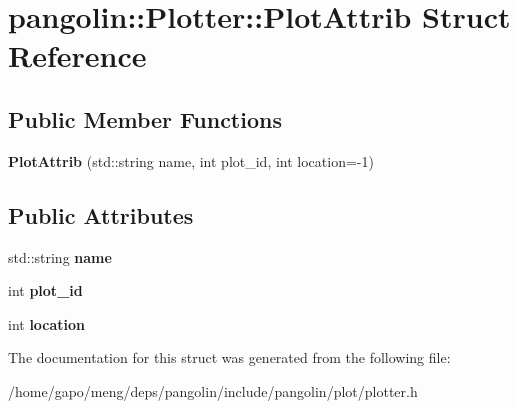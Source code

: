 \hypertarget{structpangolin_1_1_plotter_1_1_plot_attrib}{}\section{pangolin\+:\+:Plotter\+:\+:Plot\+Attrib Struct Reference}
\label{structpangolin_1_1_plotter_1_1_plot_attrib}
\subsection*{Public Member Functions}
\begin{DoxyCompactItemize}
\item 
{\bfseries Plot\+Attrib} (std\+::string name, int plot\+\_\+id, int location=-\/1)\hypertarget{structpangolin_1_1_plotter_1_1_plot_attrib_ae0a3f847da9c09f33e0806214bf09bda}{}\label{structpangolin_1_1_plotter_1_1_plot_attrib_ae0a3f847da9c09f33e0806214bf09bda}

\end{DoxyCompactItemize}
\subsection*{Public Attributes}
\begin{DoxyCompactItemize}
\item 
std\+::string {\bfseries name}\hypertarget{structpangolin_1_1_plotter_1_1_plot_attrib_a1e6f02a847fb68c99aa801517198f934}{}\label{structpangolin_1_1_plotter_1_1_plot_attrib_a1e6f02a847fb68c99aa801517198f934}

\item 
int {\bfseries plot\+\_\+id}\hypertarget{structpangolin_1_1_plotter_1_1_plot_attrib_af7844bf50d80ed36b5320b78900272ca}{}\label{structpangolin_1_1_plotter_1_1_plot_attrib_af7844bf50d80ed36b5320b78900272ca}

\item 
int {\bfseries location}\hypertarget{structpangolin_1_1_plotter_1_1_plot_attrib_ab796fecc0847b017250f67e8f5e5eb73}{}\label{structpangolin_1_1_plotter_1_1_plot_attrib_ab796fecc0847b017250f67e8f5e5eb73}

\end{DoxyCompactItemize}


The documentation for this struct was generated from the following file\+:\begin{DoxyCompactItemize}
\item 
/home/gapo/meng/deps/pangolin/include/pangolin/plot/plotter.\+h\end{DoxyCompactItemize}
